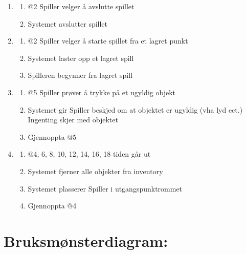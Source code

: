 \documentclass[12pt]{report}
\begin{document}
\begin{enumerate}[label=\Alph*]
\item 
\bigskip

\begin{enumerate}
\item @2 Spiller velger {\aa} avslutte spillet
\item Systemet avslutter spillet
\end{enumerate}
\item 
\bigskip

\begin{enumerate}
\item @2 Spiller velger {\aa} starte spillet fra et lagret punkt
\item Systemet laster opp et lagret spill
\item Spilleren begynner fra lagret spill
\end{enumerate}
\item 
\bigskip

\begin{enumerate}
\item @5 Spiller pr{\o}ver {\aa} trykke p{\aa} et ugyldig objekt
\item Systemet gir Spiller beskjed om at objektet er ugyldig (vha lyd ect.) Ingenting skjer med objektet
\item Gjennoppta @5
\end{enumerate}
\item 
\bigskip

\begin{enumerate}
\item @4, 6, 8, 10, 12, 14, 16, 18 tiden g{\aa}r ut
\item Systemet fjerner alle objekter fra inventory
\item Systemet plasserer Spiller i utgangspunktrommet
\item Gjennoppta @4
\end{enumerate}
\end{enumerate} \newpage

\section*{Bruksm{\o}nsterdiagram:}
\end{document}
